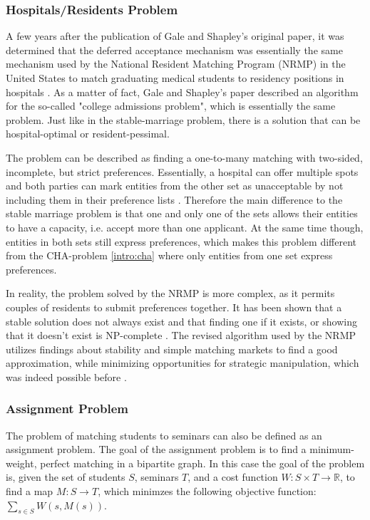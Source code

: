\subsubsection{Hospitals/Residents Problem}\label{intro:hospital-residents}
A few years after the publication of Gale and Shapley's original paper, it was determined that the deferred acceptance mechanism was essentially the same mechanism used by the National Resident Matching Program (NRMP) in the United States to match graduating medical students to residency positions in hospitals \cite{Gusfield}. As a matter of fact, Gale and Shapley's paper described an algorithm for the so-called "college admissions problem"\cite{GaleShapleyOrig}, which is essentially the same problem. Just like in the stable-marriage problem, there is a solution that can be hospital-optimal or resident-pessimal. 

The problem can be described as finding a one-to-many matching with two-sided, incomplete, but strict preferences. Essentially, a hospital can offer multiple spots and both parties can mark entities from the other set as unacceptable by not including them in their preference lists \cite{RePEc:ris:nobelp:2012_005}. Therefore the main difference to the stable marriage problem is that one and only one of the sets allows their entities to have a capacity, i.e. accept more than one applicant. At the same time though, entities in both sets still express preferences, which makes this problem different from the CHA-problem \ref{intro:cha} where only entities from one set express preferences.

In reality, the problem solved by the NRMP is more complex, as it permits couples of residents to submit preferences together. It has been shown that a stable solution does not always exist and that finding one if it exists, or showing that it doesn't exist is NP-complete \cite{RONN1990285}. The revised algorithm used by the NRMP utilizes findings about stability and simple matching markets to find a good approximation, while minimizing opportunities for strategic manipulation, which was indeed possible before \cite{NBERw6963}.

\subsubsection{Assignment Problem}\label{intro_assignment}
The problem of matching students to seminars can also be defined as an assignment problem. The goal of the assignment problem is to find a minimum-weight, perfect matching in a bipartite graph. In this case the goal of the problem is, given the set of students $S$, seminars $T$, and a cost function $W: S \times T \rightarrow \mathbb{R}$, to find a map $M: S \rightarrow T$, which minimzes the following objective function:
$\sum_{s \in S} W(s, M(s))$.

